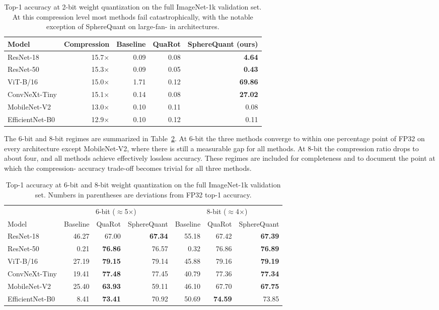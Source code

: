 \begin{table}[t]
\centering
\caption{Top-1 accuracy at 2-bit weight quantization on the full
ImageNet-1k validation set. At this compression level most methods
fail catastrophically, with the notable exception of SphereQuant on large-fan-
in architectures.}
\label{tab:vision-2bit}
\begin{tabular}{lrrrr}
\hline
Model & Compression & Baseline & QuaRot & SphereQuant (ours) \\
\hline
ResNet-18 & 15.7$\times$ & 0.09 & 0.08 & \textbf{4.64} \\
ResNet-50 & 15.3$\times$ & 0.09 & 0.05 & \textbf{0.43} \\
ViT-B/16 & 15.0$\times$ & 1.71 & 0.12 & \textbf{69.86} \\
ConvNeXt-Tiny & 15.1$\times$ & 0.14 & 0.08 & \textbf{27.02} \\
MobileNet-V2 & 13.0$\times$ & 0.10 & 0.11 & 0.08 \\
EfficientNet-B0 & 12.9$\times$ & 0.10 & 0.12 & 0.11 \\
\hline
\end{tabular}
\end{table}

The 6-bit and 8-bit regimes are summarized in
Table~\ref{tab:vision-6bit-8bit}. At 6-bit the three methods converge
to within one percentage point of FP32 on every architecture except
MobileNet-V2, where there is still a measurable gap for all methods.
At 8-bit the compression ratio drops to about four, and all methods
achieve effectively lossless accuracy. These regimes are included for
completeness and to document the point at which the compression-
accuracy trade-off becomes trivial for all three methods.

\begin{table}[t]
\centering
\caption{Top-1 accuracy at 6-bit and 8-bit weight quantization on the
full ImageNet-1k validation set. Numbers in parentheses are
deviations from FP32 top-1 accuracy.}
\label{tab:vision-6bit-8bit}
\begin{tabular}{l|rrr|rrr}
\hline
 & \multicolumn{3}{c|}{6-bit ($\approx$5$\times$)}
 & \multicolumn{3}{c}{8-bit ($\approx$4$\times$)} \\
Model & Baseline & QuaRot & SphereQuant & Baseline & QuaRot & SphereQuant \\
\hline
ResNet-18 & 46.27 & 67.00 & \textbf{67.34} & 55.18 & 67.42 & \textbf{67.39} \\
ResNet-50 & 0.21 & \textbf{76.86} & 76.57 & 0.32 & 76.86 & \textbf{76.89} \\
ViT-B/16 & 27.19 & \textbf{79.15} & 79.14 & 45.88 & 79.16 & \textbf{79.19} \\
ConvNeXt-Tiny & 19.41 & \textbf{77.48} & 77.45 & 40.79 & 77.36 & \textbf{77.34} \\
MobileNet-V2 & 25.40 & \textbf{63.93} & 59.11 & 46.10 & 67.70 & \textbf{67.75} \\
EfficientNet-B0 & 8.41 & \textbf{73.41} & 70.92 & 50.69 & \textbf{74.59} & 73.85 \\
\hline
\end{tabular}
\end{table}

